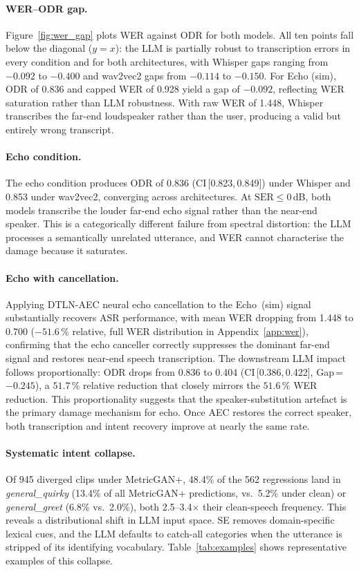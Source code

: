 \documentclass[11pt]{article}
\begin{document}
\paragraph{WER--ODR gap.}
Figure~\ref{fig:wer_gap} plots WER against ODR for both models.
All ten points fall below the diagonal ($y\!=\!x$): the LLM is
partially robust to transcription errors in every condition and for
both architectures, with Whisper gaps ranging from $-0.092$ to
$-0.400$ and wav2vec2 gaps from $-0.114$ to $-0.150$.
For Echo (sim), ODR of 0.836 and capped WER of 0.928 yield a
gap of $-0.092$, reflecting WER saturation rather than LLM robustness. With raw
WER of 1.448, Whisper transcribes the far-end loudspeaker rather than
the user, producing a valid but entirely wrong transcript.

\paragraph{Echo condition.}
The echo condition produces ODR of 0.836 (CI\,[0.823,\,0.849]) under
Whisper and 0.853 under wav2vec2, converging across architectures.
At $\text{SER}\!\leq\!0$\,dB, both models transcribe the louder
far-end echo signal rather than the near-end speaker.
This is a categorically different failure from spectral distortion:
the LLM processes a semantically unrelated utterance, and WER cannot
characterise the damage because it saturates.

\paragraph{Echo with cancellation.}
Applying DTLN-AEC neural echo cancellation to the
Echo~(sim) signal substantially recovers ASR
performance, with mean WER dropping from 1.448 to 0.700
($-51.6\,\%$ relative, full WER distribution in
Appendix~\ref{app:wer}), confirming that the echo
canceller correctly suppresses the dominant far-end
signal and restores near-end speech transcription.
The downstream LLM impact follows proportionally:
ODR drops from 0.836 to 0.404
(CI\,[0.386,\,0.422], Gap\,=\,$-0.245$),
a $51.7\,\%$ relative reduction that closely mirrors
the $51.6\,\%$ WER reduction.
This proportionality suggests that the
speaker-substitution artefact is the primary damage
mechanism for echo. Once AEC restores the correct
speaker, both transcription and intent recovery
improve at nearly the same rate.

\paragraph{Systematic intent collapse.}
Of 945 diverged clips under MetricGAN{+}, 48.4\% of the 562
regressions land in \emph{general\_quirky} (13.4\% of all
MetricGAN{+} predictions, vs.\ 5.2\% under clean) or
\emph{general\_greet} (6.8\% vs.\ 2.0\%), both 2.5--3.4$\times$
their clean-speech frequency.
This reveals a distributional shift in LLM input space. SE removes
domain-specific lexical cues, and the LLM defaults to catch-all
categories when the utterance is stripped of its identifying
vocabulary.
Table~\ref{tab:examples} shows representative examples of this
collapse.
\end{document}

